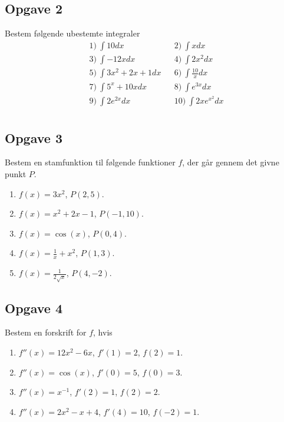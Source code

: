 \subsection*{Opgave 2}
Bestem følgende ubestemte integraler
\begin{align*}
	&1) \  \int 10 dx   &&2) \  \int x dx  \\
	&3) \  \int -12x dx   &&4) \ \int 2x^2 dx    \\
	&5) \  \int 3x^2+2x+1 dx &&6) \ \int \frac{10}{x} dx     \\
	&7) \  \int 5^x+10x dx &&8) \ \int e^{3x} dx     \\
	&9) \   \int 2e^{2x} dx  &&10) \  \int 2xe^{x^2} dx    \\
\end{align*}
\subsection*{Opgave 3}
Bestem en stamfunktion til følgende funktioner $f$, der går gennem det givne punkt $P$. 
\begin{enumerate}[label=\roman*)]
	\item $f(x) = 3x^2$, $P(2,5)$.
	\item $f(x) = x^2 + 2x - 1$, $P(-1, 10)$.
	\item $f(x) = \cos(x)$, $P(0,4)$.
	\item $f(x) = \frac{1}{x}+x^2$, $P(1,3)$.
	\item $f(x) = \frac{1}{2\sqrt{x}}$, $P(4,-2)$.
\end{enumerate}

\subsection*{Opgave 4}
Bestem en forskrift for $f$, hvis 
\begin{enumerate}[label=\roman*)]
	\item $f''(x) = 12x^2 - 6x$, $f'(1) = 2$, $f(2) = 1$.
	\item $f''(x) = \cos(x)$, $f'(0) = 5$, $f(0) = 3$.
	\item $f''(x) = x^{-1}$, $f'(2) = 1$, $f(2) = 2$.
	\item $f''(x) = 2x^2-x+4$, $f'(4) = 10$, $f(-2) = 1$.
\end{enumerate}